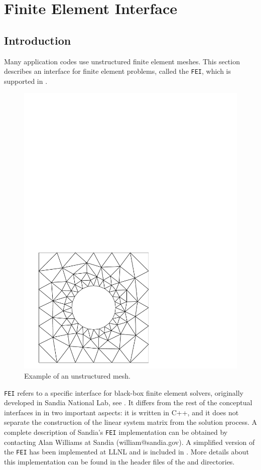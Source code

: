 \chapter{Finite Element Interface}
\label{ch-FEI}

\section{Introduction}

Many application codes use unstructured finite element meshes.
This section describes an interface for finite element problems,
called the {\tt FEI}, which is supported in \hypre{}.
\begin{figure}[htbp]
\centerline{\includegraphics[width=.3\textwidth]{square-hole.pdf}}
\caption{Example of an unstructured mesh.}
\end{figure}

{\tt FEI} refers to a specific interface for black-box finite element
solvers, originally developed in Sandia National Lab, see \cite{FEI-ref}.
It differs from the rest of the conceptual interfaces in
\hypre{} in two important aspects: it is written in C++, and
it does not separate the construction of the linear system matrix
from the solution process.
A complete description of Sandia's {\tt FEI} implementation can be obtained
by contacting Alan Williams at Sandia (william@sandia.gov).
A simplified version of the {\tt FEI} has been implemented
at LLNL and is included in \hypre{}.
More details about this implementation can be found in the header
files of the  and  directories.


